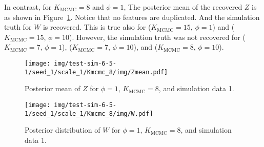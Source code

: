 \documentclass[12pt]{article} %
\begin{document}
In contrast, for $K_\text{MCMC} = 8$ and $\phi=1$, The posterior mean of the
recovered $Z$ is as shown in Figure~\ref{fig:kmcmc8-scale1-zmean}. Notice that
no features are duplicated.  And the simulation truth for $W$ is recovered.
This is true also for ($K_\text{MCMC}=15$, $\phi=1$) and ($K_\text{MCMC}=15$,
$\phi=10$).  However, the simulation truth was not recovered for
($K_\text{MCMC}=7$, $\phi=1$), ($K_\text{MCMC}=7$, $\phi=10$), and
($K_\text{MCMC}=8$, $\phi=10$).

\begin{figure}[h]
  \begin{center}
    \texttt{[image: img/test-sim-6-5-1/seed\_1/scale\_1/Kmcmc\_8/img/Zmean.pdf]}
  \end{center}
  \caption{Posterior mean of $Z$ for $\phi=1$, $K_\text{MCMC}=8$, and
  simulation data 1.}
  \label{fig:kmcmc8-scale1-zmean}
\end{figure}

\begin{figure}[h]
  \begin{center}
    \texttt{[image: img/test-sim-6-5-1/seed\_1/scale\_1/Kmcmc\_8/img/W.pdf]}
  \end{center}
  \caption{Posterior distribution of $W$ for $\phi=1$, $K_\text{MCMC}=8$, and
  simulation data 1.}
  \label{fig:kmcmc8-scale1-w}
\end{figure}
\end{document}
